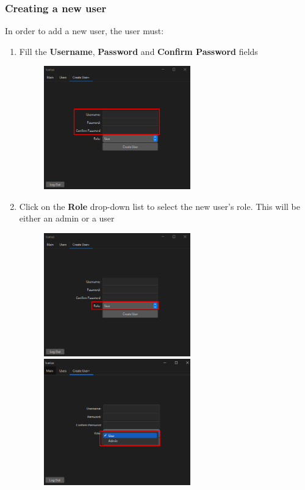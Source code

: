 \subsubsection{Creating a new user}
In order to add a new user, the user must:
\begin{enumerate}
    \item Fill the \textbf{Username}, \textbf{Password} and \textbf{Confirm Password} fields
    \begin{figure}[H]
        \centering
        \includegraphics[width=0.6\textwidth]{CreateUserTab/CreateUser/createUserText.PNG}
    \end{figure}

    \item Click on the \textbf{Role} drop-down list to select the new user’s role. This will be either an admin or a user
    \begin{figure}[H]
        \centering
        \includegraphics[width=0.6\textwidth]{CreateUserTab/CreateUser/createUserRole.PNG}
        \includegraphics[width=0.6\textwidth]{CreateUserTab/CreateUser/createUserRoleView.PNG}
    \end{figure}


\end{enumerate}
